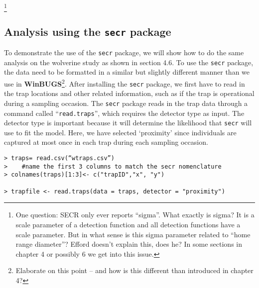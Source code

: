 \footnote{One question: SECR only ever reports “sigma”. What exactly is sigma?  It is a scale parameter of a detection function and all detection functions have a scale parameter. But in what sense is this sigma parameter related to “home range diameter”?  Efford doesn’t explain this, does he?  In some sections in chapter 4 or possibly 6 we get into this issue. 
}

\subsection{ Analysis using the \mbox{\tt secr} package}

To demonstrate the use of the \mbox{\tt secr} package, we will show how to do the
same analysis on the wolverine study as shown in section 4.6.  To use
the \mbox{\tt secr} package, the data need to be formatted in a similar but
slightly different manner than we use in {\bf
  WinBUGS}\footnote{Elaborate on this point -- and how is this
  different than introduced in chapter 4?}.  After installing
the \mbox{\tt secr} package, we first have to read in the trap locations and
other related information, such as if the trap is operational during a
sampling occasion.  The \mbox{\tt secr} package reads in the trap data through a
command called ``\mbox{\tt read.traps}'', which requires the detector type as
input.  The detector type is important because it will determine the
likelihood that \mbox{\tt secr} will use to fit the model.  Here, we have
selected ‘proximity’ since individuals are captured at most once in
each trap during each sampling occasion.
{\small
\begin{verbatim}
> traps= read.csv(“wtraps.csv”)
>    #name the first 3 columns to match the secr nomenclature
> colnames(traps)[1:3]<- c("trapID","x", "y")  

> trapfile <- read.traps(data = traps, detector = "proximity")
\end{verbatim}
}

